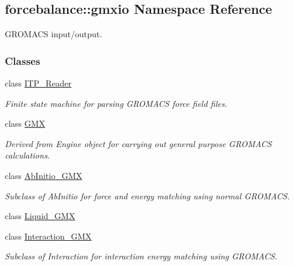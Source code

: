 \hypertarget{namespaceforcebalance_1_1gmxio}{\subsection{forcebalance\-:\-:gmxio \-Namespace \-Reference}
\label{namespaceforcebalance_1_1gmxio}
}


\-G\-R\-O\-M\-A\-C\-S input/output.  


\subsubsection*{\-Classes}
\begin{DoxyCompactItemize}
\item 
class \hyperlink{classforcebalance_1_1gmxio_1_1ITP__Reader}{\-I\-T\-P\-\_\-\-Reader}
\begin{DoxyCompactList}\small\item\em \-Finite state machine for parsing \-G\-R\-O\-M\-A\-C\-S force field files. \end{DoxyCompactList}\item 
class \hyperlink{classforcebalance_1_1gmxio_1_1GMX}{\-G\-M\-X}
\begin{DoxyCompactList}\small\item\em \-Derived from \-Engine object for carrying out general purpose \-G\-R\-O\-M\-A\-C\-S calculations. \end{DoxyCompactList}\item 
class \hyperlink{classforcebalance_1_1gmxio_1_1AbInitio__GMX}{\-Ab\-Initio\-\_\-\-G\-M\-X}
\begin{DoxyCompactList}\small\item\em \-Subclass of \-Ab\-Initio for force and energy matching using normal \-G\-R\-O\-M\-A\-C\-S. \end{DoxyCompactList}\item 
class \hyperlink{classforcebalance_1_1gmxio_1_1Liquid__GMX}{\-Liquid\-\_\-\-G\-M\-X}
\item 
class \hyperlink{classforcebalance_1_1gmxio_1_1Interaction__GMX}{\-Interaction\-\_\-\-G\-M\-X}
\begin{DoxyCompactList}\small\item\em \-Subclass of \-Interaction for interaction energy matching using \-G\-R\-O\-M\-A\-C\-S. \end{DoxyCompactList}\end{DoxyCompactItemize}
